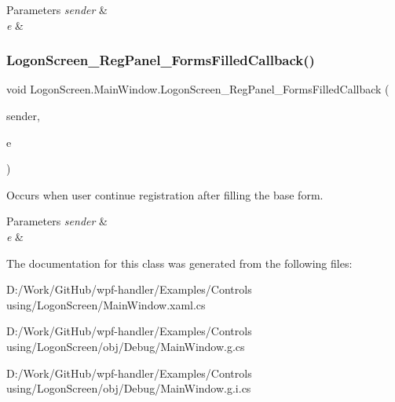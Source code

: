 \begin{DoxyParams}{Parameters}
{\em sender} & \\
\hline
{\em e} & \\
\hline
\end{DoxyParams}
\mbox{\label{class_logon_screen_1_1_main_window_af3286c0d6a22a24750b1a831f6d738fd}} 
\subsubsection{\texorpdfstring{Logon\+Screen\+\_\+\+Reg\+Panel\+\_\+\+Forms\+Filled\+Callback()}{LogonScreen\_RegPanel\_FormsFilledCallback()}}
{\footnotesize\ttfamily void Logon\+Screen.\+Main\+Window.\+Logon\+Screen\+\_\+\+Reg\+Panel\+\_\+\+Forms\+Filled\+Callback (\begin{DoxyParamCaption}\item[{object}]{sender,  }\item[{Routed\+Event\+Args}]{e }\end{DoxyParamCaption})\hspace{0.3cm}{\ttfamily [private]}}



Occurs when user continue registration after filling the base form. 


\begin{DoxyParams}{Parameters}
{\em sender} & \\
\hline
{\em e} & \\
\hline
\end{DoxyParams}


The documentation for this class was generated from the following files\+:\begin{DoxyCompactItemize}
\item 
D\+:/\+Work/\+Git\+Hub/wpf-\/handler/\+Examples/\+Controls using/\+Logon\+Screen/Main\+Window.\+xaml.\+cs\item 
D\+:/\+Work/\+Git\+Hub/wpf-\/handler/\+Examples/\+Controls using/\+Logon\+Screen/obj/\+Debug/Main\+Window.\+g.\+cs\item 
D\+:/\+Work/\+Git\+Hub/wpf-\/handler/\+Examples/\+Controls using/\+Logon\+Screen/obj/\+Debug/Main\+Window.\+g.\+i.\+cs\end{DoxyCompactItemize}
